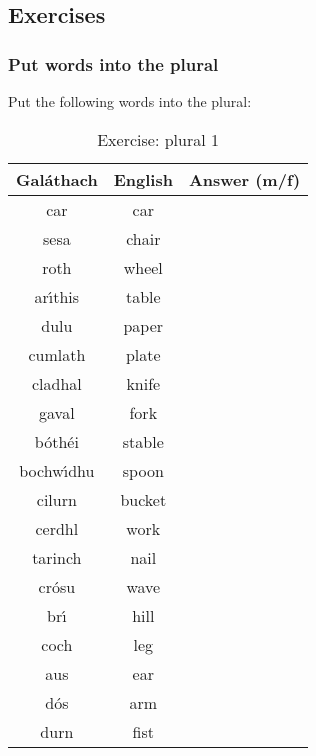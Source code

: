 \newpage
\subsection{Exercises}

\subsubsection{Put words into the plural}

Put the following words into the plural:
\begin{table}[H]
\centering
\begin{tabular}{|c|c|M{10.0cm}|}
  \toprule
  \textbf{Gal\'{a}thach} & \textbf{English} & \textbf{Answer (m/f)}\\
  \toprule
  car & car & \\
  \midrule
  sesa & chair & \\
  \midrule
  roth & wheel & \\
  \midrule
  ar\'{\i}this & table & \\
  \midrule
  dulu & paper & \\
  \midrule
  cumlath & plate & \\
  \midrule
  cladhal & knife & \\
  \midrule
  gaval & fork & \\
  \midrule
  b\'{o}th\'{e}i & stable & \\
  \midrule
  bochw\'{\i}dhu & spoon & \\
  \midrule
  cilurn & bucket & \\
  \midrule
  cerdhl & work & \\
  \midrule
  tarinch & nail & \\
  \midrule
  cr\'{o}su & wave & \\
  \midrule
  br\'{\i} & hill & \\
  \midrule
  coch & leg & \\
  \midrule
  aus & ear & \\
  \midrule
  d\'{o}s & arm & \\
  \midrule
  durn & fist & \\
  \bottomrule
\end{tabular}
\label{exercise_plural_1}
\caption{Exercise: plural 1}
\end{table}

\newpage
